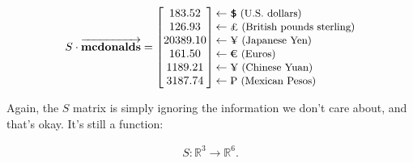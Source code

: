 \vspace{-.3in} 
\begin{align*}
S \cdot \overrightarrow{\textbf{mcdonalds}} =
\begin{bmatrix}
183.52 \\ 126.93 \\ 20389.10 \\ 161.50 \\ 1189.21 \\ 3187.74 \\
\end{bmatrix}
\begin{matrix*}[l]
\leftarrow\textrm{\small{\EyesDollar \ (U.S. dollars)}} \\
\leftarrow\textrm{\small{\pounds \ (British pounds sterling)}} \\
\leftarrow\textrm{\small{\textyen \ (Japanese Yen)}} \\
\leftarrow\textrm{\small{\EURtm \ (Euros)}} \\
\leftarrow\textrm{\small{\textyen \ (Chinese Yuan)}} \\
\leftarrow\textrm{\small{\textpeso \ (Mexican Pesos)}} \\
\end{matrix*}
\end{align*}
\vspace{-.15in}

Again, the $S$ matrix is simply ignoring the information we don't care about,
and that's okay. It's still a function:

\vspace{-.15in}
\begin{align*}
S : \mathbb{R}^3 \rightarrow \mathbb{R}^6.
\end{align*}
\vspace{-.15in}


